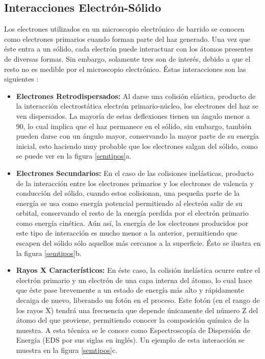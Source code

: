 \documentclass[../main.tex]{subfiles}
\begin{document}
\subsection{Interacciones Electrón-Sólido}
Los electrones utilizados en un microscopio electrónico de barrido se conocen como electrones primarios cuando forman parte del haz generado. Una vez que éste entra a un sólido, cada electrón puede interactuar con los átomos presentes de diversas formas. Sin embargo, solamente tres son de interés, debido a que el resto no es medible por el microscopio electrónico. Éstas interacciones son las siguientes \cite{Egerton2005}:
\begin{itemize}
    \item  \textbf{Electrones Retrodispersados:} Al darse una colisión elástica, producto de la interacción electrostática electrón primario-núcleo, los electrones del haz se ven dispersados. La mayoría de estas deflexiones tienen un ángulo menor a 90\grado, lo cual implica que el haz permanece en el sólido, sin embargo, también pueden darse con un ángulo mayor, conservando la mayor parte de su energía inicial, esto haciendo muy probable que los electrones salgan del sólido, como se puede ver en la figura \ref{semtipos}a.
    \item \textbf{Electrones Secundarios:} En el caso de las colisiones inelásticas, producto de la interacción entre los electrones primarios y los electrones de valencia y conducción del sólido, cuando estos colisionan, una pequeña parte de la energía se usa como energía potencial permitiendo al electrón salir de su orbital, conservando el resto de la energía perdida por el electrón primario como energía cinética. Aún así, la energía de los electrones producidos por este tipo de interacción es mucho menor a la anterior, permitiendo que escapen del sólido sólo aquellos más cercanos a la superficie. Ésto se ilustra en la figura \ref{semtipos}b.
    \item \textbf{Rayos X Característicos:} En éste caso, la colisión inelástica ocurre entre el electrón primario y un electrón de una capa interna del átomo, lo cual hace que éste pase brevemente a un estado de energía más alto y rápidamente decaiga de nuevo, liberando un fotón en el proceso. Este fotón (en el rango de los rayos X) tendrá una frecuencia que depende únicamente del número Z del átomo del que proviene, permitiendo conocer la composición química de la muestra. A esta técnica se le conoce como Espectroscopía de Dispersión de Energía (EDS por sus siglas en inglés). Un ejemplo de esta interacción se muestra en la figura \ref{semtipos}c.
\end{itemize}
\end{document}
